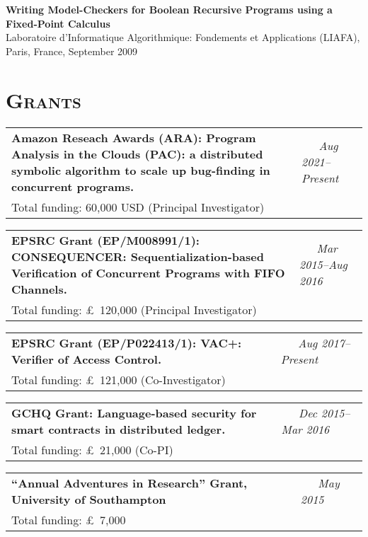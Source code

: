 \begin{resume}
{\bf Writing Model-Checkers for Boolean Recursive Programs using a
Fixed-Point Calculus}\\
Laboratoire d'Informatique Algorithmique: Fondements et Applications  (LIAFA), \\
Paris, France, September 2009

\section{\bfseries \scshape  Grants}



\begin{tabular}{@{}p{4.6in}p{1.8in}}
{\bf Amazon Reseach Awards (ARA): Program Analysis in the Clouds (PAC): a distributed symbolic algorithm to scale up bug-finding in concurrent programs. } & \emph{~~~Aug 2021--Present}  \\
Total funding: 60,000 USD (Principal Investigator)\\
\end{tabular}



\begin{tabular}{@{}p{4.6in}p{1.8in}}
{\bf EPSRC Grant (EP/M008991/1): CONSEQUENCER: Sequentialization-based Verification of Concurrent Programs with FIFO Channels. } & \emph{~~~Mar 2015--Aug 2016}  \\
Total funding: \pounds ~120,000 (Principal Investigator)\\
\end{tabular}


\begin{tabular}{@{}p{4.6in}p{1.8in}}
{\bf EPSRC Grant (EP/P022413/1): VAC+: Verifier of Access Control. } & \emph{~~~Aug 2017--Present}  \\
Total funding: \pounds ~121,000 (Co-Investigator)\\
\end{tabular}


\begin{tabular}{@{}p{4.6in}p{1.8in}}
{\bf  GCHQ Grant: Language-based security for smart contracts in distributed ledger. } & \emph{~~~Dec 2015--Mar 2016}  \\
Total funding: \pounds ~21,000 (Co-PI)\\
\end{tabular}





\begin{tabular}{@{}p{4.6in}p{1.8in}}
{\bf ``Annual Adventures in Research'' Grant, University of Southampton} & \emph{~~~May 2015}  \\
Total funding: \pounds ~7,000 \\
\end{tabular}


\end{resume}
